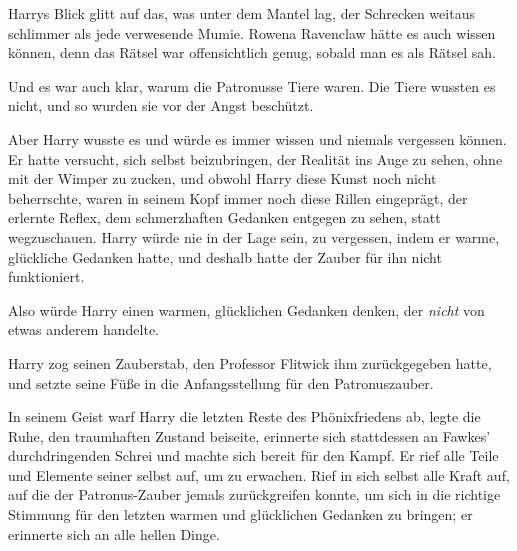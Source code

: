 Harrys Blick glitt auf das, was unter dem Mantel lag, der Schrecken weitaus schlimmer als jede verwesende Mumie. Rowena Ravenclaw hätte es auch wissen können, denn das Rätsel war offensichtlich genug, sobald man es als Rätsel sah.

Und es war auch klar, warum die Patronusse Tiere waren. Die Tiere wussten es nicht, und so wurden sie vor der Angst beschützt.

Aber Harry wusste es und würde es immer wissen und niemals vergessen können. Er hatte versucht, sich selbst beizubringen, der Realität ins Auge zu sehen, ohne mit der Wimper zu zucken, und obwohl Harry diese Kunst noch nicht beherrschte, waren in seinem Kopf immer noch diese Rillen eingeprägt, der erlernte Reflex, dem schmerzhaften Gedanken entgegen zu sehen, statt wegzuschauen. Harry würde nie in der Lage sein, zu vergessen, indem er warme, glückliche Gedanken hatte, und deshalb hatte der Zauber für ihn nicht funktioniert.

Also würde Harry einen warmen, glücklichen Gedanken denken, der \emph{nicht} von etwas anderem handelte.

Harry zog seinen Zauberstab, den Professor Flitwick ihm zurückgegeben hatte, und setzte seine Füße in die Anfangsstellung für den Patronuszauber.

In seinem Geist warf Harry die letzten Reste des Phönixfriedens ab, legte die Ruhe, den traumhaften Zustand beiseite, erinnerte sich stattdessen an Fawkes' durchdringenden Schrei und machte sich bereit für den Kampf. Er rief alle Teile und Elemente seiner selbst auf, um zu erwachen. Rief in sich selbst alle Kraft auf, auf die der Patronus-Zauber jemals zurückgreifen konnte, um sich in die richtige Stimmung für den letzten warmen und glücklichen Gedanken zu bringen; er erinnerte sich an alle hellen Dinge.

